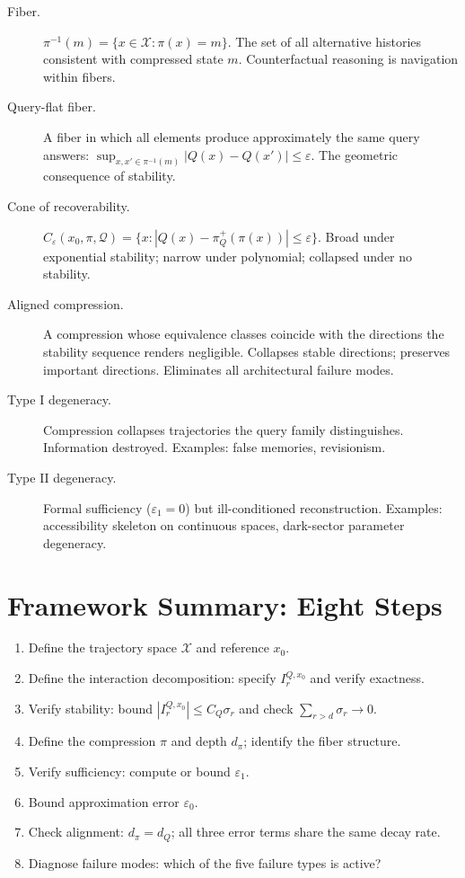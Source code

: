 \begin{description}
\item[Fiber.] $\pi^{-1}(m) = \{x \in \mathcal{X} : \pi(x) = m\}$. The set of all alternative histories consistent with compressed state $m$. Counterfactual reasoning is navigation within fibers.

\item[Query-flat fiber.] A fiber in which all elements produce approximately the same query answers: $\sup_{x,x' \in \pi^{-1}(m)} |Q(x) - Q(x')| \leq \varepsilon$. The geometric consequence of stability.

\item[Cone of recoverability.] $C_\varepsilon(x_0,\pi,\mathcal{Q}) = \{x : |Q(x) - \pi^+_Q(\pi(x))| \leq \varepsilon\}$. Broad under exponential stability; narrow under polynomial; collapsed under no stability.

\item[Aligned compression.] A compression whose equivalence classes coincide with the directions the stability sequence renders negligible. Collapses stable directions; preserves important directions. Eliminates all architectural failure modes.

\item[Type I degeneracy.] Compression collapses trajectories the query family distinguishes. Information destroyed. Examples: false memories, revisionism.

\item[Type II degeneracy.] Formal sufficiency ($\varepsilon_1 = 0$) but ill-conditioned reconstruction. Examples: accessibility skeleton on continuous spaces, dark-sector parameter degeneracy.
\end{description}

\section{Framework Summary: Eight Steps}

\begin{enumerate}
  \item Define the trajectory space $\mathcal{X}$ and reference $x_0$.
  \item Define the interaction decomposition: specify $I_r^{Q,x_0}$ and verify exactness.
  \item Verify stability: bound $|I_r^{Q,x_0}| \leq C_Q \sigma_r$ and check $\sum_{r>d} \sigma_r \to 0$.
  \item Define the compression $\pi$ and depth $d_\pi$; identify the fiber structure.
  \item Verify sufficiency: compute or bound $\varepsilon_1$.
  \item Bound approximation error $\varepsilon_0$.
  \item Check alignment: $d_\pi = d_Q$; all three error terms share the same decay rate.
  \item Diagnose failure modes: which of the five failure types is active?
\end{enumerate}

